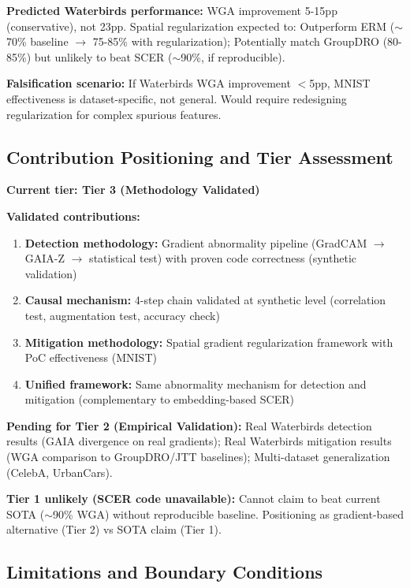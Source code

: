 \textbf{Predicted Waterbirds performance:} WGA improvement 5-15pp (conservative), not 23pp. Spatial regularization expected to:
Outperform ERM ($\sim$70\% baseline $\rightarrow$ 75-85\% with regularization);
Potentially match GroupDRO (80-85\%) but unlikely to beat SCER ($\sim$90\%, if reproducible).

\textbf{Falsification scenario:} If Waterbirds WGA improvement $<$5pp, MNIST effectiveness is dataset-specific, not general. Would require redesigning regularization for complex spurious features.

\subsection{Contribution Positioning and Tier Assessment}

\textbf{Current tier: Tier 3 (Methodology Validated)}

\textbf{Validated contributions:}
\begin{enumerate}
\item \textbf{Detection methodology:} Gradient abnormality pipeline (GradCAM $\rightarrow$ GAIA-Z $\rightarrow$ statistical test) with proven code correctness (synthetic validation)
\item \textbf{Causal mechanism:} 4-step chain validated at synthetic level (correlation test, augmentation test, accuracy check)
\item \textbf{Mitigation methodology:} Spatial gradient regularization framework with PoC effectiveness (MNIST)
\item \textbf{Unified framework:} Same abnormality mechanism for detection and mitigation (complementary to embedding-based SCER)
\end{enumerate}

\textbf{Pending for Tier 2 (Empirical Validation):}
Real Waterbirds detection results (GAIA divergence on real gradients);
Real Waterbirds mitigation results (WGA comparison to GroupDRO/JTT baselines);
Multi-dataset generalization (CelebA, UrbanCars).

\textbf{Tier 1 unlikely (SCER code unavailable):}
Cannot claim to beat current SOTA ($\sim$90\% WGA) without reproducible baseline. Positioning as gradient-based alternative (Tier 2) vs SOTA claim (Tier 1).

\subsection{Limitations and Boundary Conditions}

